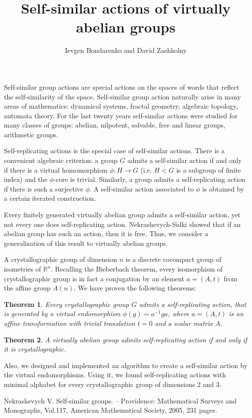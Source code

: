 \documentclass[12pt]{article}
\author{Ievgen Bondarenko and David Zashkolny}
\title{\Large\textbf{Self-similar actions of virtually abelian groups}\vspace{-0.5cm}}
\newtheorem{theorem}{Theorem}
\theoremstyle{definition}
\begin{document}
	\maketitle
	
	Self-similar group actions are special actions on the spaces of words that reflect the self-similarity of the space. Self-similar group action naturally arise in many areas of mathematics: dynamical systems, fractal geometry, algebraic topology, automata theory. For the last twenty years self-similar actions were studied for many classes of groups: abelian, nilpotent, solvable, free and linear groups, arithmetic groups. 
	
	Self-replicating actions is the special case of self-similar actions. There is a convenient algebraic criterion: a group $G$ admits a self-similar action if and only if there is a virtual homomorphism $\phi : H \rightarrow G$ (i.e. $H < G$ is a subgroup of finite index) and the $\phi$-core is trivial. Similarly, a group admits a self-replicating action if there is such a surjective $\phi$. A self-similar action associated to $\phi$ is obtained by a certain iterated construction. 
	
	Every finitely generated virtually abelian group admits a self-similar action, yet not every one does self-replicating action. Nekrashevych-Sidki \cite{Nekrashevych} showed that if an abelian group has such an action, then it is free. Thus, we consider a generalization of this result to virtually abelian groups.
	
	A crystallographic group of dimension $n$ is a discrete cocompact group of isometries of $\mathbb{R}^n$. Recalling the Bieberbach theorem, every isomorphism of crystallographic group is in fact a conjugation by an element $a = (A, t)$ from the affine group $A(n)$. We have proven the following theorems: 
	
	\begin{theorem}
		Every crystallographic group $G$ admits a self-replicating action, that is generated by a virtual endomorphism $\phi(g) = a^{-1}ga$, where $a = (A, t)$ is an affine transformation with trivial translation $t = 0$ and a scalar matrix $A$.  
	\end{theorem}
	
	\begin{theorem}
		A virtually abelian group admits self-replicating action if and only if it is crystallographic.
	\end{theorem}
	
	Also, we designed and implemented an algorithm to create a self-similar action by the virtual endomorphisms. Using it, we found self-replicating actions with minimal alphabet for every crystallographic group of dimensions 2 and 3. 
	
	\begin{thebibliography}{9}
		 Nekrashevych V. Self-similar groups. -- Providence: Mathematical Surveys and Monographs, Vol.117, American Mathematical Society, 2005, 231 pages.
	\end{thebibliography}
\end{document}
